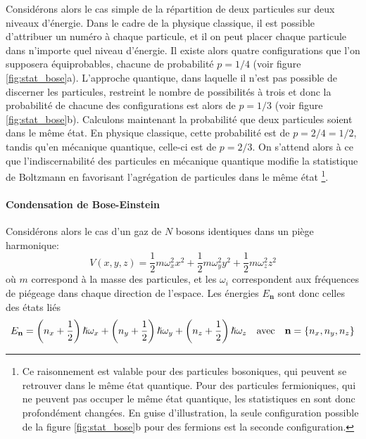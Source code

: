Considérons alors le cas simple de la répartition de deux particules sur deux niveaux d'énergie. Dans le cadre de la physique classique, il est possible d'attribuer un numéro à chaque particule, et il on peut placer chaque particule dans n'importe quel niveau d'énergie. Il existe alors quatre configurations que l'on supposera équiprobables, chacune de probabilité $p=1/4$ (voir figure \ref{fig:stat_bose}a). L'approche quantique, dans laquelle il n'est pas possible de discerner les particules, restreint le nombre de possibilités à trois et donc la probabilité de chacune des configurations est alors de $p=1/3$ (voir figure \ref{fig:stat_bose}b). Calculons maintenant la probabilité que deux particules soient dans le même état. En physique classique, cette probabilité est de $p=2/4=1/2$, tandis qu'en mécanique quantique, celle-ci est de $p=2/3$. On s'attend alors à ce que l'indiscernabilité des particules en mécanique quantique modifie la statistique de Boltzmann en favorisant l'agrégation de particules dans le même état \footnote{Ce raisonnement est valable pour des particules bosoniques, qui peuvent se retrouver dans le même état quantique. Pour des particules fermioniques, qui ne peuvent pas occuper le même état quantique, les statistiques en sont donc profondément changées. En guise d'illustration, la seule configuration possible de la figure \ref{fig:stat_bose}b pour des fermions est la seconde configuration.}.

\paragraph*{Condensation de Bose-Einstein}
Considérons alors le cas d'un gaz de $N$ bosons identiques dans un piège harmonique:
\begin{equation}
V(x,y,z)=\frac{1}{2}m \omega_x^2 x^2 + \frac{1}{2}m \omega_y^2 y^2 + \frac{1}{2}m \omega_z^2 z^2
\label{eq:piege_harmonique}
\end{equation}
où $m$ correspond à la masse des particules, et les $\omega_i$ correspondent aux fréquences de piégeage dans chaque direction de l'espace. Les énergies $E_{\mathbf{n}}$ sont donc celles des états liés
\begin{equation}
E_{\mathbf{n}}=\left(n_x+\frac{1}{2}\right) \hslash \omega_x + \left(n_y+\frac{1}{2}\right) \hslash \omega_y + \left(n_z+\frac{1}{2}\right) \hslash \omega_z \quad \text{avec}\quad \mathbf{n}=\lbrace n_x,n_y,n_z\rbrace
\end{equation}

